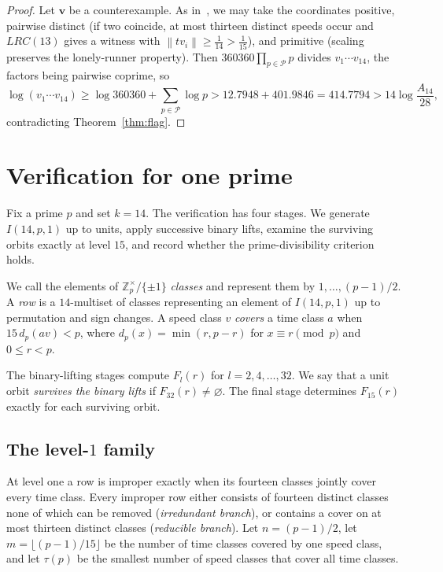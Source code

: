 \documentclass[11pt]{article}
\theoremstyle{definition}
\theoremstyle{remark}
\newcommand{\Z}{\mathbb{Z}}
\newcommand{\vct}[1]{\mathbf{#1}}
\newcommand{\nearest}[1]{\left\lVert #1\right\rVert}
\newcommand{\RawThreshUB}{414.7794}       %
\newcommand{\DivisorLogLB}{12.7948}       %
\newcommand{\TargetUB}{401.9846}          %
\begin{document}
\begin{proof}
Let $\vct{v}$ be a counterexample.  As in~\cite{Allikvere26}, we may take
the coordinates positive, pairwise distinct (if two coincide, at most
thirteen distinct speeds occur and $LRC(13)$ gives a witness with
$\nearest{tv_i}\geq\frac1{14}>\frac1{15}$), and primitive (scaling
preserves the lonely-runner property).  Then $360360\prod_{p\in\mathcal
P}p$ divides $v_1\cdots v_{14}$, the factors being pairwise coprime, so
\[
  \log(v_1\cdots v_{14})\geq\log360360+\sum_{p\in\mathcal P}\log p
  >\DivisorLogLB+\TargetUB=\RawThreshUB>14\log\frac{A_{14}}{28},
\]
contradicting Theorem~\ref{thm:flag}.
\end{proof}

\section{Verification for one prime}\label{sec:pipeline}

Fix a prime $p$ and set $k=14$.  The verification has four stages.  We
generate $I(14,p,1)$ up to units, apply successive binary lifts, examine
the surviving orbits exactly at level $15$, and record whether the
prime-divisibility criterion holds.

We call the elements of $\Z_p^{\times}/\{\pm1\}$ \emph{classes} and
represent them by $1,\ldots,(p-1)/2$.  A \emph{row} is a $14$-multiset of
classes representing an element of $I(14,p,1)$ up to permutation and sign
changes.  A speed class $v$ \emph{covers} a time class $a$ when
$15\,d_p(av)<p$, where $d_p(x)=\min(r,p-r)$ for
$x\equiv r\pmod p$ and $0\leq r<p$.

The binary-lifting stages compute $F_l(r)$ for $l=2,4,\ldots,32$.  We say
that a unit orbit \emph{survives the binary lifts} if
$F_{32}(r)\neq\varnothing$.  The final stage determines $F_{15}(r)$
exactly for each surviving orbit.

\subsection{The \texorpdfstring{level-$1$}{level-1} family}\label{sec:basefamily}

At level one a row is improper exactly when its fourteen classes jointly
cover every time class.  Every improper row either consists of fourteen
distinct classes none of which can be removed (\emph{irredundant
branch}), or contains a cover on at most thirteen distinct classes
(\emph{reducible branch}).  Let $n=(p-1)/2$, let
$m=\lfloor(p-1)/15\rfloor$ be the number of time classes covered by one
speed class, and let $\tau(p)$ be the smallest number of speed classes
that cover all time classes.
\end{document}
